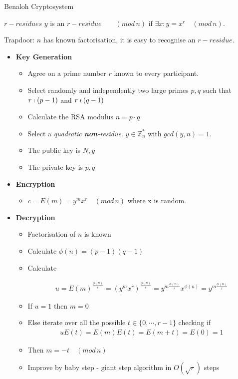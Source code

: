 \documentclass{beamer}
\newcommand{\zns}[1]{ \mathbb{Z}_{#1}^* }
\newcommand{\md}[1]{\quad (mod \, {#1})}
\begin{document}
\begin{frame}[allowframebreaks]{Benaloh Cryptosystem}
\begin{block}{$r-residues$}
$y$ is an $r-residue \quad \md{n}$ if $\exists x: y = x^r \md{n}$. 

Trapdoor: $n$ has known factorisation, it is easy to recognise an $r-residue$. 
\end{block}

\begin{itemize}
\item \textbf{Key Generation} 
\begin{itemize}
\item Agree on a prime number $r$ known to every participant.
\item Select randomly and independently two large primes $p,q$ such that $r \shortmid (p-1)$ and $r \nshortmid (q-1) $
\item Calculate the RSA modulus $n = p \cdot q$
\item Select a \textit{quadratic \textbf{non}-residue}. $y \in \zns{n}$ with $gcd(y,n)=1$. 
\item The public key is $N,y$
\item The private key is $p,q$
\end{itemize}
\item \textbf{Encryption}
\begin{itemize}
\item $c = E(m) = y^{m} x^r \md{n}$ where x is random. 
\end{itemize}
\item \textbf{Decryption}
\begin{itemize}
\item Factorisation of $n$ is known
\item Calculate $\phi(n) = (p-1)(q-1)$
\item Calculate 
\begin{large}
\begin{align*}
u=E(m)^{\frac{\phi(n)}{r}} = (y^{m} x^r)^{\frac{\phi(n)}{r}} = y^{m\frac{\phi(n)}{r}} x^{\phi(n)} = y^{m\frac{\phi(n)}{r}}
\end{align*}
\end{large}
\item If $u=1$ then $m=0$
\item Else iterate over all the possible $t \in \{0,\cdots,r-1 \}$ checking if 
\begin{align*}
uE(t)=E(m)E(t)=E(m+t)=E(0)=1
\end{align*}
\item Then $m=-t \md{n}$
\item Improve by baby step - giant step algorithm in $O(\sqrt{r})$ steps
\end{itemize}
\end{itemize}

\end{frame}
\end{document}
